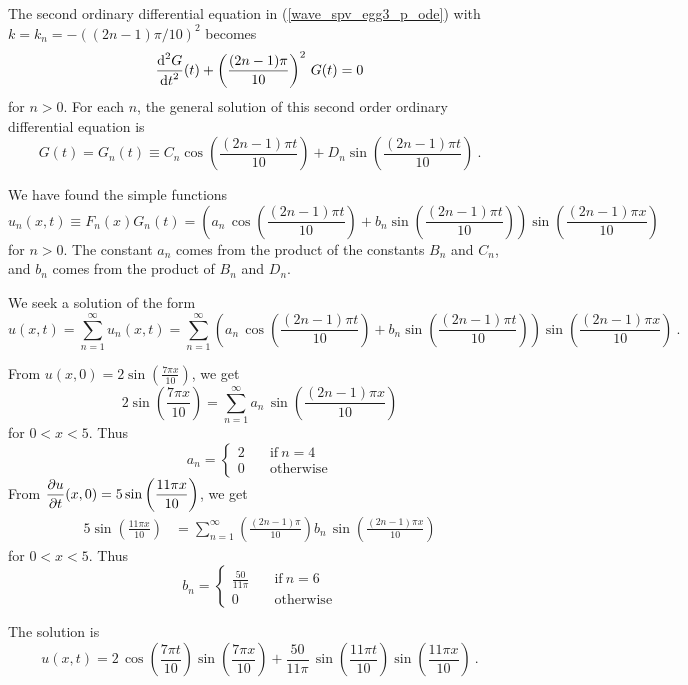 \begin{egg}
The second ordinary differential equation in (\ref{wave_spv_egg3_p_ode}) with
$\displaystyle k = k_n = -\left((2n-1)\pi/10\right)^2$
becomes
\[
\frac{\displaystyle \mathrm{d}^{2}{G}} {\displaystyle \mathrm{d}{t}^{2}}(t) + \left(\frac{(2n-1)\pi}{10}\right)^2\,G(t) = 0
\]
for $n>0$.  For each $n$, the general solution
of this second order ordinary differential equation is
\[
G(t) = G_n(t) \equiv C_n \cos\left(\frac{(2n-1)\pi t}{10}\right)
+ D_n \sin\left(\frac{(2n-1)\pi t}{10}\right) \ .
\]

We have found the simple functions
\[
u_n(x,t) \equiv F_n(x)G_n(t) = \left( a_n\,
\cos\left(\frac{(2n-1)\pi t}{10}\right) + b_n
\sin\left(\frac{(2n-1)\pi t}{10}\right) \right)
\sin\left(\frac{(2n-1)\pi x}{10}\right)
\]
for $n>0$.  The constant $a_n$ comes from the product of the constants
$B_n$ and $C_n$, and $b_n$ comes from the product of $B_n$ and $D_n$.

We seek a solution of the form
\[
u(x,t) = \sum_{n=1}^\infty u_n(x,t)
= \sum_{n=1}^\infty \left( a_n\, \cos\left(\frac{(2n-1)\pi t}{10}\right)
 + b_n \sin\left(\frac{(2n-1)\pi t}{10}\right) \right)
\sin\left(\frac{(2n-1)\pi x}{10}\right) \ .
\]

From $\displaystyle u(x,0) = 2 \sin\left(\frac{7 \pi x}{10}\right)$, we get
\[
2 \sin\left(\frac{7 \pi x}{10}\right)
= \sum_{n=1}^\infty a_n\,\sin\left(\frac{(2n-1)\pi x}{10}\right)
\]
for $0<x<5$.  Thus
\[
a_n =
\begin{cases}
2 & \quad \text{if} \ n=4 \\
0 & \quad \text{otherwise}
\end{cases}
\]
From $\displaystyle \frac{\partial{u}}{\partial t}(x,0)
= 5 \sin\left(\frac{11\pi x}{10}\right)$, we get
\begin{align*}
5 \sin\left(\frac{11\pi x}{10}\right)
& = \sum_{n=1}^\infty \left(\frac{(2n-1)\pi}{10}\right) b_n\,
\sin\left(\frac{(2n-1)\pi x}{10}\right)
\end{align*}
for $0<x<5$.  Thus
\[
b_n =
\begin{cases}
\displaystyle \frac{50}{11\pi} & \quad \text{if} \ n=6 \\
0 & \quad \text{otherwise}
\end{cases}
\]

The solution is
\[
u(x,t) = 2\, \cos\left(\frac{7\pi t}{10}\right)
\sin\left(\frac{7\pi x}{10}\right)
+\frac{50}{11\pi} \, \sin
\left(\frac{11\pi t}{10}\right) \sin\left(\frac{11\pi x}{10}\right) \ .
\]
\end{egg}

